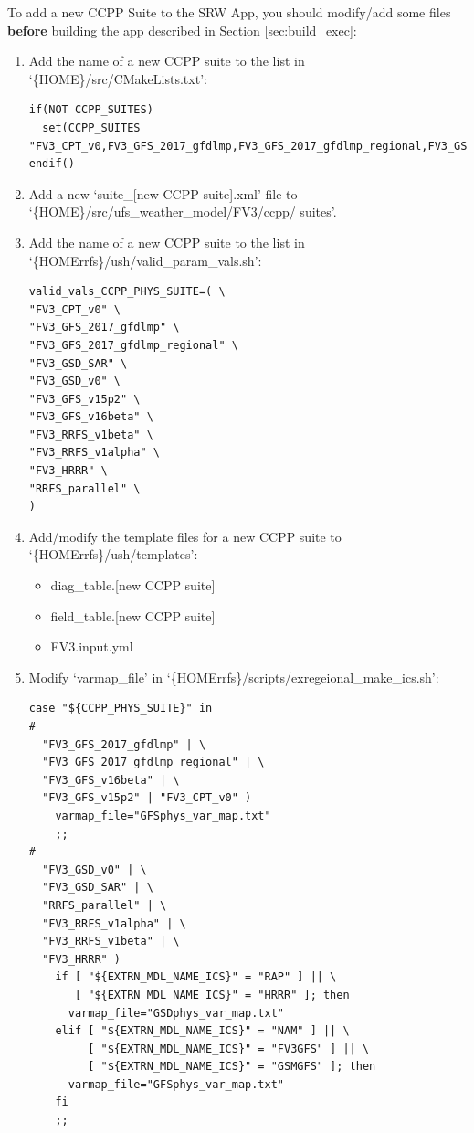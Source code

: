 \documentclass[11pt,fleqn]{report}              %
\begin{document}
To add a new CCPP Suite to the SRW App, you should modify/add some files {\bf before} building the app described in Section \ref{sec:build_exec}:

\begin{enumerate}
\item Add the name of a new CCPP suite to the list in `\{HOME\}/src/CMakeLists.txt':
\lstset{language=bash}   
\begin{lstlisting}[frame=trBL,basicstyle=\scriptsize]
if(NOT CCPP_SUITES)
  set(CCPP_SUITES "FV3_CPT_v0,FV3_GFS_2017_gfdlmp,FV3_GFS_2017_gfdlmp_regional,FV3_GSD_SAR,FV3_GSD_v0,FV3_GFS_v15p2,FV3_GFS_v16beta,FV3_RRFS_v1beta,FV3_HRRR,RRFS_parallel")
endif()
\end{lstlisting}

\item Add a new `suite\_[new CCPP suite].xml' file to `\{HOME\}/src/ufs\_weather\_model/FV3/ccpp/ suites'.

\item Add the name of a new CCPP suite to the list in `\{HOMErrfs\}/ush/valid\_param\_vals.sh':
\lstset{language=bash}   
\begin{lstlisting}[frame=trBL,basicstyle=\scriptsize]
valid_vals_CCPP_PHYS_SUITE=( \
"FV3_CPT_v0" \
"FV3_GFS_2017_gfdlmp" \
"FV3_GFS_2017_gfdlmp_regional" \
"FV3_GSD_SAR" \
"FV3_GSD_v0" \
"FV3_GFS_v15p2" \
"FV3_GFS_v16beta" \
"FV3_RRFS_v1beta" \
"FV3_RRFS_v1alpha" \
"FV3_HRRR" \
"RRFS_parallel" \
)
\end{lstlisting}

\item Add/modify the template files for a new CCPP suite to `\{HOMErrfs\}/ush/templates':
\begin{itemize}
\item diag\_table.[new CCPP suite]
\item field\_table.[new CCPP suite]
\item FV3.input.yml
\end{itemize}

\item Modify `varmap\_file' in `\{HOMErrfs\}/scripts/exregeional\_make\_ics.sh':
\lstset{language=bash}   
\begin{lstlisting}[frame=trBL,basicstyle=\scriptsize]
case "${CCPP_PHYS_SUITE}" in
#
  "FV3_GFS_2017_gfdlmp" | \
  "FV3_GFS_2017_gfdlmp_regional" | \
  "FV3_GFS_v16beta" | \
  "FV3_GFS_v15p2" | "FV3_CPT_v0" )
    varmap_file="GFSphys_var_map.txt"
    ;;
#
  "FV3_GSD_v0" | \
  "FV3_GSD_SAR" | \
  "RRFS_parallel" | \
  "FV3_RRFS_v1alpha" | \
  "FV3_RRFS_v1beta" | \
  "FV3_HRRR" )
    if [ "${EXTRN_MDL_NAME_ICS}" = "RAP" ] || \
       [ "${EXTRN_MDL_NAME_ICS}" = "HRRR" ]; then
      varmap_file="GSDphys_var_map.txt"
    elif [ "${EXTRN_MDL_NAME_ICS}" = "NAM" ] || \
         [ "${EXTRN_MDL_NAME_ICS}" = "FV3GFS" ] || \
         [ "${EXTRN_MDL_NAME_ICS}" = "GSMGFS" ]; then
      varmap_file="GFSphys_var_map.txt"
    fi
    ;;
\end{lstlisting}


\end{enumerate}
\end{document}
